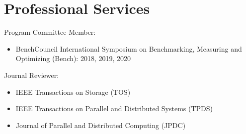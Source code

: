 \section{Professional Services}
Program Committee Member:
\begin{itemize}
\item {BenchCouncil International Symposium on Benchmarking, Measuring and Optimizing (Bench): 2018, 2019, 2020}
\end{itemize}
Journal Reviewer:
\begin{itemize}
\item {IEEE Transactions on Storage (TOS)}
\item {IEEE Transactions on Parallel and Distributed Systems (TPDS)}
\item {Journal of Parallel and Distributed Computing (JPDC)}
\end{itemize}

